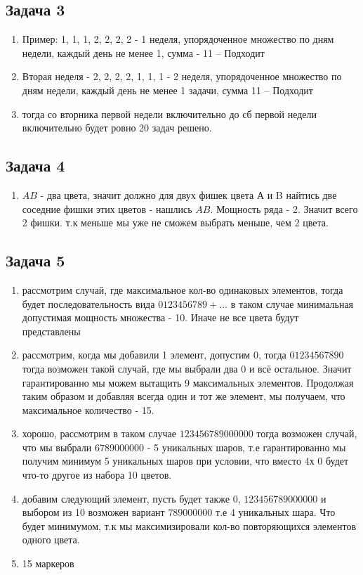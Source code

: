 \documentclass[a4paper,12pt]{article}
\begin{document}
\subsection{Задача 3}
\begin{enumerate}
    \item Пример: {1, 1, 1, 2, 2, 2, 2} - 1 неделя, упорядоченное множество по дням недели, каждый день не менее 1, сумма - 11 -- Подходит
    \item Вторая неделя - {2, 2, 2, 2, 1, 1, 1} - 2 неделя, упорядоченное множество по дням недели, каждый день не менее 1 задачи, сумма 11 -- Подходит
    \item тогда со вторника первой недели включительно до сб первой недели включительно будет ровно 20 задач решено.
\end{enumerate}

\subsection{Задача 4}
\begin{enumerate}
    \item $AB$ - два цвета, значит должно для двух фишек цвета А и B найтись две соседние фишки этих цветов - нашлись $AB$. Мощность ряда - 2. Значит всего 2 фишки. т.к меньше мы уже не сможем выбрать меньше, чем 2 цвета.
\end{enumerate}

\subsection{Задача 5}
\begin{enumerate}
    \item рассмотрим случай, где максимальное кол-во одинаковых элементов, тогда будет последовательность вида $0123456789+...$ в таком случае минимальная допустимая мощность множества - 10. Иначе не все цвета будут представлены
    \item рассмотрим, когда мы добавили 1 элемент, допустим 0, тогда $01234567890$ тогда возможен такой случай, где мы выбрали два 0 и всё остальное. Значит гарантированно мы можем вытащить 9 максимальных элементов. Продолжая таким образом и добавляя всегда один и тот же элемент, мы получаем, что максимальное количество - 15. 
    \item хорошо, рассмотрим в таком случае $123456789000000$ тогда возможен случай, что мы выбрали $6789000000$ - 5 уникальных шаров, т.е гарантированно мы получим минимум 5 уникальных шаров при условии, что вместо 4х 0 будет что-то другое из набора 10 цветов.
    \item добавим следующий элемент, пусть будет также 0, $123456789000000$ и выбором из 10 возможен вариант $789000000$ т.е 4 уникальных шара. Что будет минимумом, т.к мы максимизировали кол-во повторяющихся элементов одного цвета.
    \item 15 маркеров
\end{enumerate}
\end{document}
